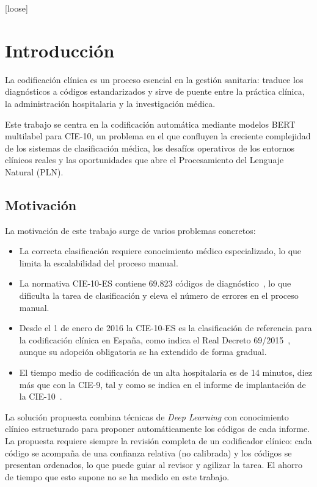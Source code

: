 [loose]{\ifdim\hsize=\textwidth\looseness=-1 \fi}
\chapter{Introducción}
\label{cap:Introduccion}

La codificación clínica es un proceso esencial en la gestión sanitaria: traduce los diagnósticos a códigos estandarizados y sirve de puente entre la práctica clínica, la administración hospitalaria y la investigación médica.

Este trabajo se centra en la codificación automática mediante modelos BERT multilabel para CIE-10, un problema en el que confluyen la creciente complejidad de los sistemas de clasificación médica, los desafíos operativos de los entornos clínicos reales y las oportunidades que abre el Procesamiento del Lenguaje Natural (PLN).

\section{Motivación}

La motivación de este trabajo surge de varios problemas concretos:
\begin{itemize}
\item La correcta clasificación requiere conocimiento médico especializado, lo que limita la escalabilidad del proceso manual.
\item La normativa CIE-10-ES contiene 69.823 códigos de diagnóstico~\cite{gogorcena2017cie10es}, lo que dificulta la tarea de clasificación y eleva el número de errores en el proceso manual.
\item Desde el 1 de enero de 2016 la CIE-10-ES es la clasificación de referencia para la codificación clínica en España, como indica el Real Decreto 69/2015~\cite{rd692015}, aunque su adopción obligatoria se ha extendido de forma gradual.
\item El tiempo medio de codificación de un alta hospitalaria es de 14 minutos, diez más que con la CIE-9, tal y como se indica en el informe de implantación de la CIE-10~\cite{sanidad2016cie10}.
\end{itemize}

La solución propuesta combina técnicas de \emph{Deep Learning} con conocimiento clínico estructurado para proponer automáticamente los códigos de cada informe. La propuesta requiere siempre la revisión completa de un codificador clínico: cada código se acompaña de una confianza relativa (no calibrada) y los códigos se presentan ordenados, lo que puede guiar al revisor y agilizar la tarea. El ahorro de tiempo que esto supone no se ha medido en este trabajo.



